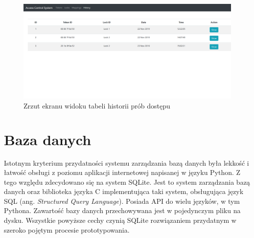	        \begin{figure}[]
	            \centering
	            \includegraphics[width=\textwidth, frame]{chapters/images/ss3.png}
	            \caption{Zrzut ekranu widoku tabeli historii prób dostępu}
	            \label{fig:ss3}
	        \end{figure}

    \section{Baza danych}
    \label{s:db}

    	Istotnym kryterium przydatności systemu zarządzania bazą danych była lekkość i łatwość obsługi z poziomu aplikacji internetowej napisanej w języku Python. Z tego względu zdecydowano się na system SQLite. Jest to system zarządzania bazą danych oraz biblioteka języka C implementująca taki system, obsługująca język SQL (ang. \textit{Structured Query Language}). Posiada API do wielu języków, w tym Pythona. Zawartość bazy danych przechowywana jest w pojedynczym pliku na dysku. Wszystkie powyższe cechy czynią SQLite rozwiązaniem przydatnym w szeroko pojętym procesie prototypowania.
